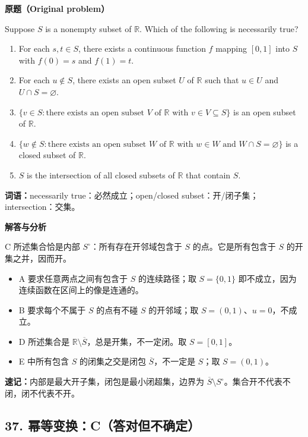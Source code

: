 \documentclass[11pt,a4paper]{ctexart}
\providecommand{\tightlist}{\setlength{\itemsep}{0pt}\setlength{\parskip}{0pt}}
\begin{document}
\textbf{原题（Original problem）}\par
Suppose $S$ is a nonempty subset of $\mathbb R$. Which of the following is necessarily true?
\begin{enumerate}[label=(\Alph*)]
\item For each $s,t\in S$, there exists a continuous function $f$ mapping $[0,1]$ into $S$ with $f(0)=s$ and $f(1)=t$.
\item For each $u\notin S$, there exists an open subset $U$ of $\mathbb R$ such that $u\in U$ and $U\cap S=\varnothing$.
\item $\{v\in S:\text{there exists an open subset }V\text{ of }\mathbb R\text{ with }v\in V\subseteq S\}$ is an open subset of $\mathbb R$.
\item $\{w\notin S:\text{there exists an open subset }W\text{ of }\mathbb R\text{ with }w\in W\text{ and }W\cap S=\varnothing\}$ is a closed subset of $\mathbb R$.
\item $S$ is the intersection of all closed subsets of $\mathbb R$ that contain $S$.
\end{enumerate}
\textbf{词语：}necessarily true：必然成立；open/closed subset：开/闭子集；intersection：交集。

\textbf{解答与分析}\par


C 所述集合恰是内部 \(S^\circ\)：所有存在开邻域包含于 \(S\)
的点。它是所有包含于 \(S\) 的开集之并，因而开。

\begin{itemize}
\tightlist
\item
  A 要求任意两点之间有包含于 \(S\) 的连续路径；取 \(S=\{0,1\}\)
  即不成立，因为连续函数在区间上的像是连通的。
\item
  B 要求每个不属于 \(S\) 的点有不碰 \(S\) 的开邻域；取
  \(S=(0,1)\)、\(u=0\)，不成立。
\item
  D 所述集合是 \(\mathbb R\setminus\overline S\)，总是开集，不一定闭。取
  \(S=[0,1]\)。
\item
  E 中所有包含 \(S\) 的闭集之交是闭包 \(\overline S\)，不一定是
  \(S\)；取 \(S=(0,1)\)。
\end{itemize}

\textbf{速记：}内部是最大开子集，闭包是最小闭超集，边界为
\(\overline S\setminus S^\circ\)。集合开不代表不闭，闭不代表不开。

\hypertarget{ux5e42ux7b49ux53d8ux6362cux7b54ux5bf9ux4f46ux4e0dux786eux5b9a}{%
\subsection{37.
幂等变换：C（答对但不确定）}\label{ux5e42ux7b49ux53d8ux6362cux7b54ux5bf9ux4f46ux4e0dux786eux5b9a}}
\end{document}
